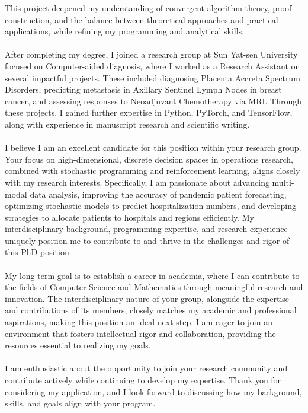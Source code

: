 \documentclass[11pt,a4paper, final]{moderncv}
\begin{document}
This project deepened my understanding of convergent algorithm theory, proof construction, 
and the balance between theoretical approaches and practical applications, 
while refining my programming and analytical skills.
\ \\
\ \\
After completing my degree, 
I joined a research group at Sun Yat-sen University focused on Computer-aided diagnosis, 
where I worked as a Research Assistant on several impactful projects. 
These included diagnosing Placenta Accreta Spectrum Disorders, 
predicting metastasis in Axillary Sentinel Lymph Nodes in breast cancer, 
and assessing responses to Neoadjuvant Chemotherapy via MRI. 
Through these projects, I gained further expertise in Python, PyTorch, and TensorFlow, 
along with experience in manuscript research and scientific writing.
\ \\
\ \\
I believe I am an excellent candidate for this position within your research group. 
Your focus on high-dimensional, discrete decision spaces in operations research, 
combined with stochastic programming and reinforcement learning, aligns closely with my research interests. 
Specifically, I am passionate about advancing multi-modal data analysis, 
improving the accuracy of pandemic patient forecasting, optimizing stochastic models to predict hospitalization numbers, 
and developing strategies to allocate patients to hospitals and regions efficiently. 
My interdisciplinary background, programming expertise, and research experience uniquely position me 
to contribute to and thrive in the challenges and rigor of this PhD position.
\ \\
\ \\
My long-term goal is to establish a career in academia, 
where I can contribute to the fields of Computer Science and Mathematics through meaningful research and innovation. 
The interdisciplinary nature of your group, alongside the expertise and contributions of its members, 
closely matches my academic and professional aspirations, making this position an ideal next step. 
I am eager to join an environment that fosters intellectual rigor and collaboration, 
providing the resources essential to realizing my goals.
\ \\
\ \\
I am enthusiastic about the opportunity to join your research community 
and contribute actively while continuing to develop my expertise. 
Thank you for considering my application, 
and I look forward to discussing how my background, skills, and goals align with your program.
\end{document}

